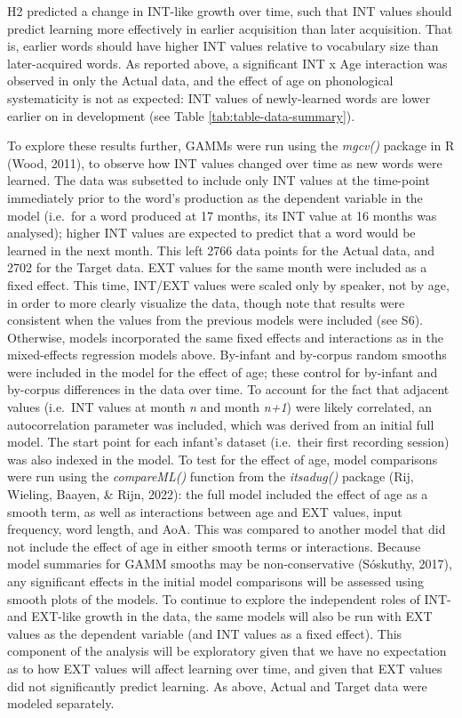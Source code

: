 \documentclass[
  man]{apa6}
\begin{document}
H2 predicted a change in INT-like growth over time, such that INT values should predict learning more effectively in earlier acquisition than later acquisition. That is, earlier words should have higher INT values relative to vocabulary size than later-acquired words. As reported above, a significant INT x Age interaction was observed in only the Actual data, and the effect of age on phonological systematicity is not as expected: INT values of newly-learned words are lower earlier on in development (see Table \ref{tab:table-data-summary}).

To explore these results further, GAMMs were run using the \emph{mgcv()} package in R (Wood, 2011), to observe how INT values changed over time as new words were learned. The data was subsetted to include only INT values at the time-point immediately prior to the word's production as the dependent variable in the model (i.e.~for a word produced at 17 months, its INT value at 16 months was analysed); higher INT values are expected to predict that a word would be learned in the next month. This left 2766 data points for the Actual data, and 2702 for the Target data. EXT values for the same month were included as a fixed effect. This time, INT/EXT values were scaled only by speaker, not by age, in order to more clearly visualize the data, though note that results were consistent when the values from the previous models were included (see S6). Otherwise, models incorporated the same fixed effects and interactions as in the mixed-effects regression models above. By-infant and by-corpus random smooths were included in the model for the effect of age; these control for by-infant and by-corpus differences in the data over time. To account for the fact that adjacent values (i.e.~INT values at month \emph{n} and month \emph{n+1}) were likely correlated, an autocorrelation parameter was included, which was derived from an initial full model. The start point for each infant's dataset (i.e.~their first recording session) was also indexed in the model. To test for the effect of age, model comparisons were run using the \emph{compareML()} function from the \emph{itsadug()} package (Rij, Wieling, Baayen, \& Rijn, 2022): the full model included the effect of age as a smooth term, as well as interactions between age and EXT values, input frequency, word length, and AoA. This was compared to another model that did not include the effect of age in either smooth terms or interactions. Because model summaries for GAMM smooths may be non-conservative (Sóskuthy, 2017), any significant effects in the initial model comparisons will be assessed using smooth plots of the models. To continue to explore the independent roles of INT- and EXT-like growth in the data, the same models will also be run with EXT values as the dependent variable (and INT values as a fixed effect). This component of the analysis will be exploratory given that we have no expectation as to how EXT values will affect learning over time, and given that EXT values did not significantly predict learning. As above, Actual and Target data were modeled separately.
\end{document}

